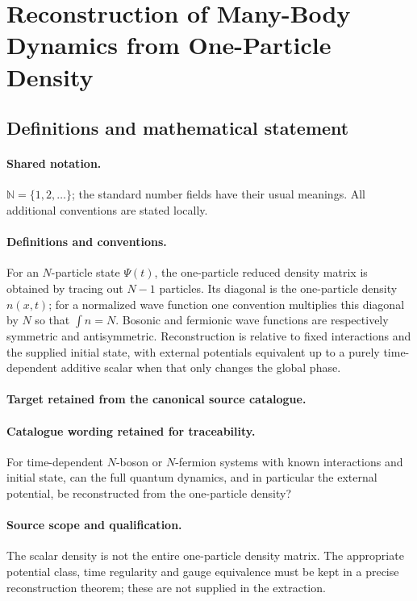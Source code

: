 \documentclass[11pt]{article}
\begin{document}
\section{Reconstruction of Many-Body Dynamics from One-Particle Density}\label{statement}

\subsection{Definitions and mathematical statement}

\paragraph{Shared notation.}$\mathbb N=\{1,2,\ldots\}$; the standard number fields have their usual meanings. All additional conventions are stated locally.


\paragraph{Definitions and conventions.}
For an $N$-particle state $\Psi(t)$, the one-particle reduced density matrix is obtained by tracing out $N-1$ particles. Its diagonal is the one-particle density $n(x,t)$; for a normalized wave function one convention multiplies this diagonal by $N$ so that $\int n=N$. Bosonic and fermionic wave functions are respectively symmetric and antisymmetric. Reconstruction is relative to fixed interactions and the supplied initial state, with external potentials equivalent up to a purely time-dependent additive scalar when that only changes the global phase.

\paragraph{Target retained from the canonical source catalogue.}
\paragraph{Catalogue wording retained for traceability.}
For time-dependent $N$-boson or $N$-fermion systems with known interactions and initial state, can the full quantum dynamics, and in particular the external potential, be reconstructed from the one-particle density?

\paragraph{Source scope and qualification.}
The scalar density is not the entire one-particle density matrix. The appropriate potential class, time regularity and gauge equivalence must be kept in a precise reconstruction theorem; these are not supplied in the extraction.
\end{document}
